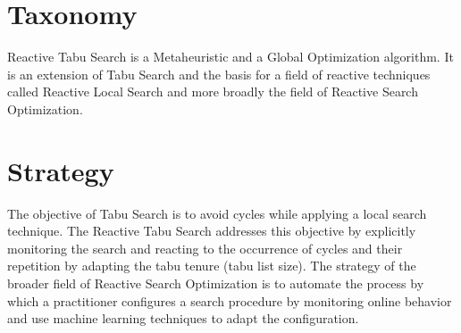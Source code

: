 \documentclass[a4paper, 11pt]{article}
\begin{document}
\section{Taxonomy}
\label{sec:taxonomy}
Reactive Tabu Search is a Metaheuristic and a Global Optimization algorithm.
It is an extension of Tabu Search \cite{Brownlee2010f} and the basis for a field of reactive techniques called Reactive Local Search and more broadly the field of Reactive Search Optimization.

\section{Strategy}
\label{sec:strategy}
The objective of Tabu Search is to avoid cycles while applying a local search technique. The Reactive Tabu Search addresses this objective by explicitly monitoring the search and reacting to the occurrence of cycles and their repetition by adapting the tabu tenure (tabu list size).
The strategy of the broader field of Reactive Search Optimization is to automate the process by which a practitioner configures a search procedure by monitoring online behavior and use machine learning techniques to adapt the configuration.

\end{document}
